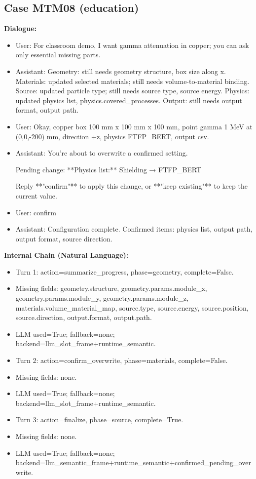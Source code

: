 \documentclass[11pt]{ctexart}
\begin{document}
\subsection{Case MTM08 (education)}
\textbf{Dialogue:}
\begin{itemize}
\item User: For classroom demo, I want gamma attenuation in copper; you can ask only essential missing parts.
\item Assistant: Geometry: still needs geometry structure, box size along x. Materials: updated selected materials; still needs volume-to-material binding. Source: updated particle type; still needs source type, source energy. Physics: updated physics list, physics.covered\_processes. Output: still needs output format, output path.
\item User: Okay, copper box 100 mm x 100 mm x 100 mm, point gamma 1 MeV at (0,0,-200) mm, direction +z, physics FTFP\_BERT, output csv.
\item Assistant: You're about to overwrite a confirmed setting.

Pending change:  
**Physics list:** Shielding → FTFP\_BERT

Reply **"confirm"** to apply this change, or **"keep existing"** to keep the current value.
\item User: confirm
\item Assistant: Configuration complete. Confirmed items: physics list, output path, output format, source direction.
\end{itemize}
\textbf{Internal Chain (Natural Language):}
\begin{itemize}
\item Turn 1: action=summarize\_progress, phase=geometry, complete=False.
\item Missing fields: geometry.structure, geometry.params.module\_x, geometry.params.module\_y, geometry.params.module\_z, materials.volume\_material\_map, source.type, source.energy, source.position, source.direction, output.format, output.path.
\item LLM used=True; fallback=none; backend=llm\_slot\_frame+runtime\_semantic.
\item Turn 2: action=confirm\_overwrite, phase=materials, complete=False.
\item Missing fields: none.
\item LLM used=True; fallback=none; backend=llm\_slot\_frame+runtime\_semantic.
\item Turn 3: action=finalize, phase=source, complete=True.
\item Missing fields: none.
\item LLM used=True; fallback=none; backend=llm\_semantic\_frame+runtime\_semantic+confirmed\_pending\_overwrite.
\end{itemize}
\end{document}

